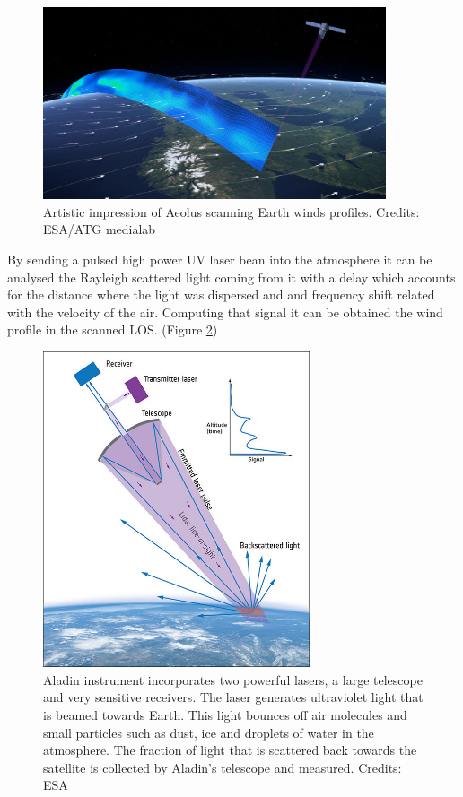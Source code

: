 \begin{figure}[h]
	\centering
	\includegraphics[width=0.9\textwidth]{img/Winds_profile.jpg}
	\caption[Wind profile scanning]{Artistic impression of Aeolus scanning Earth winds profiles.
	Credits: ESA/ATG medialab \cite{scanning}}
	\label{fig:scanning}
\end{figure}

By sending a pulsed high power UV laser bean into the atmosphere it can be analysed
the Rayleigh scattered light coming from it with a delay which accounts for the
distance where the light was dispersed and and frequency shift related with the velocity
of the air. Computing that signal it can be obtained the wind profile in the scanned
LOS. (Figure \ref{fig:lidar})\\

\begin{figure}[h]
	\centering
	\includegraphics[width=0.7\textwidth]{img/20170519_Lidar_concept_ESA.jpg}
	\caption[Doppler Wind Lidar measurement technique]{Aladin
	instrument incorporates two powerful lasers, a large telescope and very
	sensitive receivers. The laser generates ultraviolet light that is beamed
	towards Earth. This light bounces off air molecules and small particles
	such as dust, ice and droplets of water in the atmosphere. The fraction
	of light that is scattered back towards the satellite is collected by
	Aladin’s telescope and measured. Credits: ESA \cite{lidar_concept}}
	\label{fig:lidar}
\end{figure}

